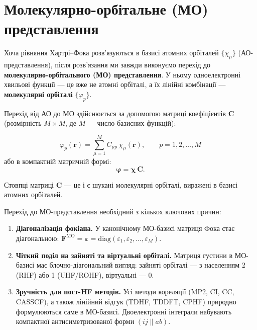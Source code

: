 \section{Молекулярно-орбітальне (МО) представлення}

Хоча рівняння Хартрі–Фока розв’язуються в базисі атомних орбіталей $\{\chi_\mu\}$ (АО-представлення), після розв’язання ми завжди виконуємо перехід до \textbf{молекулярно-орбітального (МО) представлення}. У ньому одноелектронні хвильові функції — це вже не атомні орбіталі, а їх лінійні комбінації — \textbf{молекулярні орбіталі} $\{\varphi_p\}$.

Перехід від АО до МО здійснюється за допомогою матриці коефіцієнтів $\mathbf{C}$ (розмірність $M\times M$, де $M$ — число базисних функцій):

\begin{equation}\label{eq:MO_expansion}
    \varphi_p(\mathbf{r}) = \sum_{\mu=1}^{M} C_{\mu p}\,\chi_\mu(\mathbf{r}),
    \qquad p = 1,2,\dots,M
\end{equation}
або в компактній матричній формі:
\begin{equation}
    \boldsymbol{\varphi} = \boldsymbol{\chi}\,\mathbf{C}.
\end{equation}

Стовпці матриці $\mathbf{C}$ — це і є шукані молекулярні орбіталі, виражені в базисі атомних орбіталей.

Перехід до МО-представлення необхідний з кількох ключових причин:

\begin{enumerate}
    \item \textbf{Діагоналізація фокіана.}
          У канонічному МО-базисі матриця Фока стає діагональною:
          $\mathbf{F}^{\text{MO}} = \boldsymbol{\varepsilon} = \mathrm{diag}(\varepsilon_1,\varepsilon_2,\dots,\varepsilon_M)$.
    \item \textbf{Чіткий поділ на зайняті та віртуальні орбіталі.}
          Матриця густини в МО-базисі має блочно-діагональний вигляд: зайняті орбіталі — з населенням 2 (RHF) або 1 (UHF/ROHF), віртуальні — 0.
    \item \textbf{Зручність для пост-HF методів.}
          Усі методи кореляції (MP2, CI, CC, CASSCF), а також лінійний відгук (TDHF, TDDFT, CPHF) природно формулюються саме в МО-базисі. Двоелектронні інтеграли набувають компактної антисиметризованої форми $(ij\|ab)$.
\end{enumerate}

